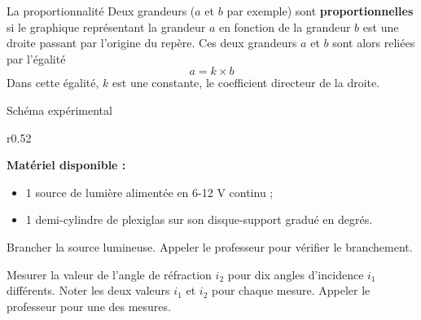 \begin{doc}{La proportionnalité}
  Deux grandeurs ($a$ et $b$ par exemple) sont \textbf{proportionnelles} si le graphique représentant la grandeur $a$ en fonction de la grandeur $b$ est une droite passant par l'origine du repère.
  Ces deux grandeurs $a$ et $b$ sont alors reliées par l'égalité 
  \begin{equation*}
    a = k\times b
  \end{equation*}
  Dans cette égalité, $k$ est une constante, le coefficient directeur de la droite.
\end{doc}

\newpage
\vspace*{-36pt}
\begin{doc}{Schéma expérimental}
  \label{doc:schema_exp_disque_optique}
  \begin{wrapfigure}[2]{r}{0.52\linewidth}
    \vspace*{-54pt}
    \centering
  \end{wrapfigure}
  \textbf{Matériel disponible :}
  \begin{itemize}
    \item 1 source de lumière alimentée en 6-12 V continu ;
    \item 1 demi-cylindre de plexiglas sur son disque-support gradué en degrés.
  \end{itemize}
  \bigskip
  
  \phantom{b}
\end{doc}


\mesure
  Brancher la source lumineuse. Appeler le professeur pour vérifier le branchement.

\mesure
  Mesurer la valeur de l'angle de réfraction $i_2$ pour dix angles d'incidence $i_1$ différents.
  Noter les deux valeurs $i_1$ et $i_2$ pour chaque mesure.
  Appeler le professeur pour une des mesures.




